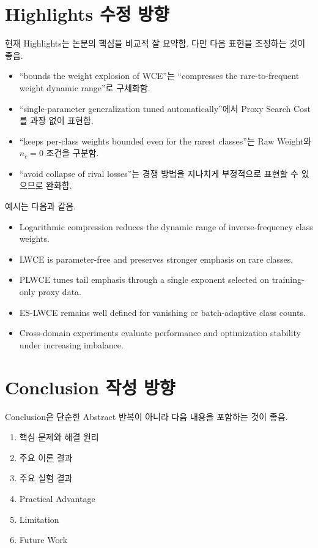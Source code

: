 \documentclass[11pt,a4paper]{article}
\begin{document}
\section{Highlights 수정 방향}

현재 Highlights는 논문의 핵심을 비교적 잘 요약함. 다만 다음 표현을 조정하는 것이 좋음.

\begin{itemize}
\item ``bounds the weight explosion of WCE''는 ``compresses the rare-to-frequent weight dynamic range''로 구체화함.
\item ``single-parameter generalization tuned automatically''에서 Proxy Search Cost를 과장 없이 표현함.
\item ``keeps per-class weights bounded even for the rarest classes''는 Raw Weight와 \(n_c=0\) 조건을 구분함.
\item ``avoid collapse of rival losses''는 경쟁 방법을 지나치게 부정적으로 표현할 수 있으므로 완화함.
\end{itemize}

예시는 다음과 같음.

\begin{itemize}
\item Logarithmic compression reduces the dynamic range of inverse-frequency class weights.
\item LWCE is parameter-free and preserves stronger emphasis on rare classes.
\item PLWCE tunes tail emphasis through a single exponent selected on training-only proxy data.
\item ES-LWCE remains well defined for vanishing or batch-adaptive class counts.
\item Cross-domain experiments evaluate performance and optimization stability under increasing imbalance.
\end{itemize}

\section{Conclusion 작성 방향}

Conclusion은 단순한 Abstract 반복이 아니라 다음 내용을 포함하는 것이 좋음.

\begin{enumerate}
\item 핵심 문제와 해결 원리
\item 주요 이론 결과
\item 주요 실험 결과
\item Practical Advantage
\item Limitation
\item Future Work
\end{enumerate}
\end{document}
